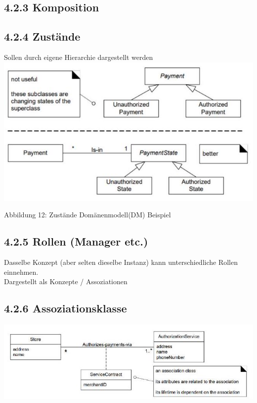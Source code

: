 \documentclass[10pt]{article}
\begin{document}
\subsection*{4.2.3 Komposition}
\subsection*{4.2.4 Zustände}
Sollen durch eigene Hierarchie dargestellt werden\\
\includegraphics[max width=\textwidth, center]{2024_12_29_0d1d7b5551ea1b4b41bdg-07(1)}

Abbildung 12: Zustände Domänenmodell(DM) Beispiel

\subsection*{4.2.5 Rollen (Manager etc.)}
Dasselbe Konzept (aber selten dieselbe Instanz) kann unterschiedliche Rollen einnehmen.\\
Dargestellt als Konzepte / Assoziationen

\subsection*{4.2.6 Assoziationsklasse}
\begin{center}
\includegraphics[max width=\textwidth]{2024_12_29_0d1d7b5551ea1b4b41bdg-07}
\end{center}
\end{document}
